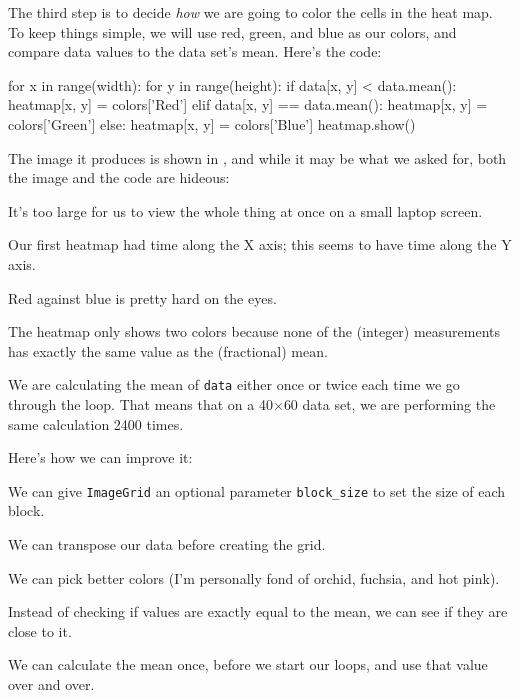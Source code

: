 The third step is to decide \emph{how} we are going to color the cells
in the heat map. To keep things simple, we will use red, green, and blue
as our colors, and compare data values to the data set's mean. Here's
the code:

\begin{VerbIn}
for x in range(width):
    for y in range(height):
        if data[x, y] < data.mean():
            heatmap[x, y] = colors['Red']
        elif data[x, y] == data.mean():
            heatmap[x, y] = colors['Green']
        else:
            heatmap[x, y] = colors['Blue']
heatmap.show()
\end{VerbIn}


The image it produces is shown in ,
and while it may be what we asked for,
both the image and the code are hideous:

\begin{swcenumerate}
\item
  It's too large for us to view the whole thing at once on a small
  laptop screen.
\item
  Our first heatmap had time along the X axis; this seems to have time
  along the Y axis.
\item
  Red against blue is pretty hard on the eyes.
\item
  The heatmap only shows two colors because none of the (integer)
  measurements has exactly the same value as the (fractional) mean.
\item
  We are calculating the mean of \texttt{data} either once or twice each
  time we go through the loop. That means that on a 40${\times}$60 data set, we
  are performing the same calculation 2400 times.
\end{swcenumerate}

Here's how we can improve it:

\begin{swcenumerate}
\item
  We can give \texttt{ImageGrid} an optional parameter
  \texttt{block\_size} to set the size of each block.
\item
  We can transpose our data before creating the grid.
\item
  We can pick better colors (I'm personally fond of orchid, fuchsia, and
  hot pink).
\item
  Instead of checking if values are exactly equal to the mean, we can
  see if they are close to it.
\item
  We can calculate the mean once, before we start our loops, and use
  that value over and over.
\end{swcenumerate}

